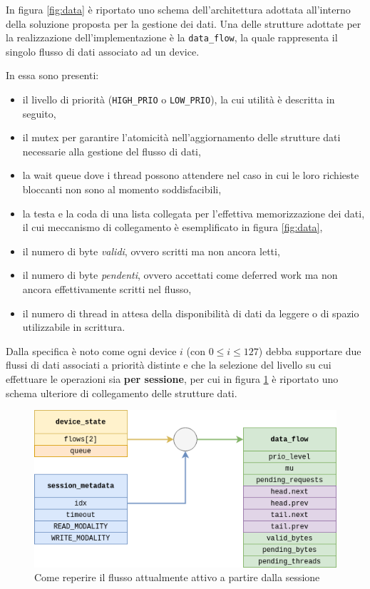 \documentclass{article}
\begin{document}
In figura \ref{fig:data} è riportato uno schema dell'architettura adottata all'interno della soluzione proposta per la gestione dei dati. Una delle strutture adottate per la realizzazione dell'implementazione è la \texttt{data\_flow}, la quale rappresenta il singolo flusso di dati associato ad un device.

In essa sono presenti:
\begin{itemize}
        \item il livello di priorità (\texttt{HIGH\_PRIO} o \texttt{LOW\_PRIO}), la cui utilità è descritta in seguito,
        \item il mutex per garantire l'atomicità nell'aggiornamento delle strutture dati necessarie alla gestione del flusso di dati,
        \item la wait queue dove i thread possono attendere nel caso in cui le loro richieste bloccanti non sono al momento soddisfacibili,
        \item la testa e la coda di una lista collegata per l'effettiva memorizzazione dei dati, il cui meccanismo di collegamento è esemplificato in figura \ref{fig:data},
        \item il numero di byte \textit{validi}, ovvero scritti ma non ancora letti,
        \item il numero di byte \textit{pendenti}, ovvero accettati come deferred work ma non ancora effettivamente scritti nel flusso,
        \item il numero di thread in attesa della disponibilità di dati da leggere o di spazio utilizzabile in scrittura.
\end{itemize}

Dalla specifica è noto come ogni device $i$ (con $0\leq i \leq 127$) debba supportare due flussi di dati associati a priorità distinte e che la selezione del livello su cui effettuare le operazioni sia \textbf{per sessione}, per cui in figura \ref{fig:get_active_flow} è riportato uno schema ulteriore di collegamento delle strutture dati.

\begin{figure}[htbp]
        \centering
        \includegraphics[width=.8\textwidth]{get_active_flow}
        \caption{Come reperire il flusso attualmente attivo a partire dalla sessione}
        \label{fig:get_active_flow}
\end{figure}
\end{document}
